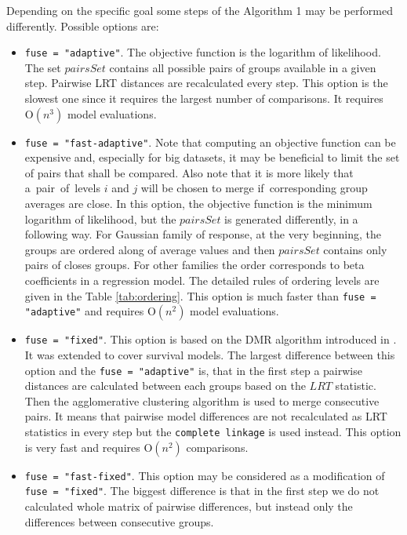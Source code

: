 \documentclass[12pt]{article}
\begin{document}
Depending on the specific goal some steps of the Algorithm 1 may be performed differently. Possible options are:
\begin{itemize}
\item \texttt{fuse = {"}adaptive{"}}. The objective function is the logarithm of likelihood. The set $pairsSet$ contains all possible pairs of groups available in a given step. Pairwise LRT distances are recalculated every step. This option is the slowest one since it requires the largest number of comparisons. It requires $\text{O}(n^3)$ model evaluations.
\item \texttt{fuse = {"}fast-adaptive{"}}. 
Note that computing an objective function can be expensive and, especially for big datasets, it may be beneficial to limit the set of pairs that shall be compared. Also note that it is more likely that a~pair~of~levels $i$ and $j$ will be chosen to merge if~corresponding group averages are close. In this option, the objective function is the minimum logarithm of likelihood, but the $pairsSet$ is generated differently, in a following way. 
For Gaussian family of response, at the very beginning, the groups are ordered along of average values and then $pairsSet$ contains only pairs of closes groups. 
For other families the order corresponds to beta coefficients in a regression model. The detailed rules of ordering levels are given in the Table \ref{tab:ordering}.
This option is much faster than \texttt{fuse = {"}adaptive{"}} and requires $\text{O}(n^2)$ model evaluations.
\item \texttt{fuse = {"}fixed{"}}. This option is based on the DMR algorithm introduced in \cite{Proch}. It was extended to cover survival models. The largest difference between this option and the \texttt{fuse = {"}adaptive{"}} is, that in the first step a pairwise distances are calculated between each groups based on the $LRT$ statistic. Then the agglomerative clustering algorithm is used to merge consecutive pairs. It means that pairwise model differences are not recalculated as LRT statistics in every step but the \texttt{complete linkage} is used instead. 
This option is very fast and requires $\text{O}(n^2)$ comparisons.
\item \texttt{fuse = {"}fast-fixed{"}}. This option may be considered as a modification of \texttt{fuse = {"}fixed{"}}. The biggest difference is that in the first step we do not calculated whole matrix of pairwise differences, but instead only the differences between consecutive groups.
\end{itemize}
\end{document}
